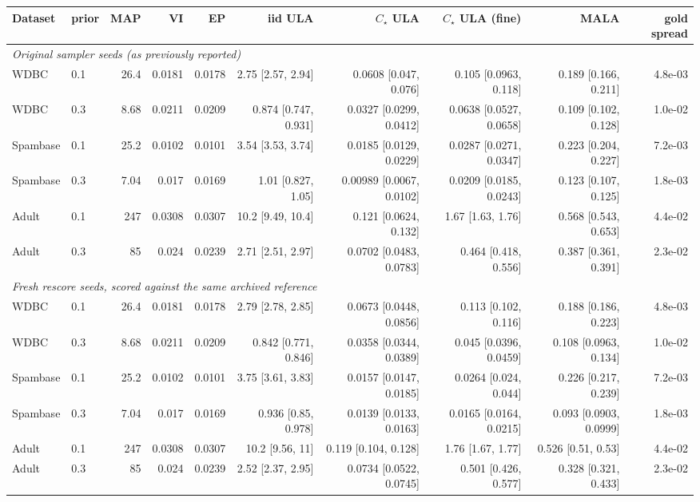 \begin{tabular}{llrrrrrrrr}
\toprule
Dataset & prior & MAP & VI & EP & iid ULA & $C_\star$ ULA & $C_\star$ ULA (fine) & MALA & gold spread \\
\midrule
\multicolumn{10}{l}{\emph{Original sampler seeds (as previously reported)}} \\
WDBC & 0.1 & 26.4 & 0.0181 & 0.0178 & 2.75 [2.57, 2.94] & 0.0608 [0.047, 0.076] & 0.105 [0.0963, 0.118] & 0.189 [0.166, 0.211] & 4.8e-03 \\
WDBC & 0.3 & 8.68 & 0.0211 & 0.0209 & 0.874 [0.747, 0.931] & 0.0327 [0.0299, 0.0412] & 0.0638 [0.0527, 0.0658] & 0.109 [0.102, 0.128] & 1.0e-02 \\
Spambase & 0.1 & 25.2 & 0.0102 & 0.0101 & 3.54 [3.53, 3.74] & 0.0185 [0.0129, 0.0229] & 0.0287 [0.0271, 0.0347] & 0.223 [0.204, 0.227] & 7.2e-03 \\
Spambase & 0.3 & 7.04 & 0.017 & 0.0169 & 1.01 [0.827, 1.05] & 0.00989 [0.0067, 0.0102] & 0.0209 [0.0185, 0.0243] & 0.123 [0.107, 0.125] & 1.8e-03 \\
Adult & 0.1 & 247 & 0.0308 & 0.0307 & 10.2 [9.49, 10.4] & 0.121 [0.0624, 0.132] & 1.67 [1.63, 1.76] & 0.568 [0.543, 0.653] & 4.4e-02 \\
Adult & 0.3 & 85 & 0.024 & 0.0239 & 2.71 [2.51, 2.97] & 0.0702 [0.0483, 0.0783] & 0.464 [0.418, 0.556] & 0.387 [0.361, 0.391] & 2.3e-02 \\
\midrule
\multicolumn{10}{l}{\emph{Fresh rescore seeds, scored against the same archived reference}} \\
WDBC & 0.1 & 26.4 & 0.0181 & 0.0178 & 2.79 [2.78, 2.85] & 0.0673 [0.0448, 0.0856] & 0.113 [0.102, 0.116] & 0.188 [0.186, 0.223] & 4.8e-03 \\
WDBC & 0.3 & 8.68 & 0.0211 & 0.0209 & 0.842 [0.771, 0.846] & 0.0358 [0.0344, 0.0389] & 0.045 [0.0396, 0.0459] & 0.108 [0.0963, 0.134] & 1.0e-02 \\
Spambase & 0.1 & 25.2 & 0.0102 & 0.0101 & 3.75 [3.61, 3.83] & 0.0157 [0.0147, 0.0185] & 0.0264 [0.024, 0.044] & 0.226 [0.217, 0.239] & 7.2e-03 \\
Spambase & 0.3 & 7.04 & 0.017 & 0.0169 & 0.936 [0.85, 0.978] & 0.0139 [0.0133, 0.0163] & 0.0165 [0.0164, 0.0215] & 0.093 [0.0903, 0.0999] & 1.8e-03 \\
Adult & 0.1 & 247 & 0.0308 & 0.0307 & 10.2 [9.56, 11] & 0.119 [0.104, 0.128] & 1.76 [1.67, 1.77] & 0.526 [0.51, 0.53] & 4.4e-02 \\
Adult & 0.3 & 85 & 0.024 & 0.0239 & 2.52 [2.37, 2.95] & 0.0734 [0.0522, 0.0745] & 0.501 [0.426, 0.577] & 0.328 [0.321, 0.433] & 2.3e-02 \\
\bottomrule
\end{tabular}
